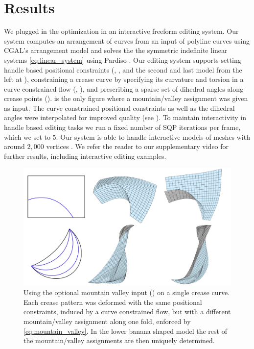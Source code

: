 \section{Results} \label{sec:results}
We plugged in the optimization \label{eq:opt} in an interactive freeform editing system. Our system computes an arrangement of curves from an input of polyline curves using CGAL's arrangement model \cite{cgal,cgal_arr1,cgal_arr2} and solves the the symmetric indefinite  linear systems \eqref{eq:linear_system} using Pardiso \cite{PARDISO1,PARDISO2,PARDISO3}. Our editing system supports setting handle based positional constraints (, , and the second and last model from the left at ), constraining a crease curve by specifying its curvature and torsion in a curve constrained flow (, ), and prescribing a sparse set of dihedral angles along crease points ().  is the only figure where a mountain/valley assignment was given as input. The curve constrained positional constraints as well as the dihedral angles were interpolated for improved quality (see ). To maintain interactivity in handle based editing tasks we run a fixed number of SQP iterations per frame, which we set to $5$. Our system is able to handle interactive models of meshes with around $2,000$ vertices . We refer the reader to our supplementary video for further results, including interactive editing examples. 

\begin{figure} [h]
	\centering
	\includegraphics[width=\linewidth]{figures/MV_bias_modeling}
	\caption{Using the optional mountain valley input () on a single crease curve. Each crease pattern was deformed with the same positional constraints, induced by a curve constrained flow, but with a different mountain/valley assignment along one fold, enforced by \eqref{eq:mountain_valley}. In the lower banana shaped model the rest of the mountain/valley assignments are then uniquely determined.}
	\label{fig:MV_bias_modeling}
\end{figure}

